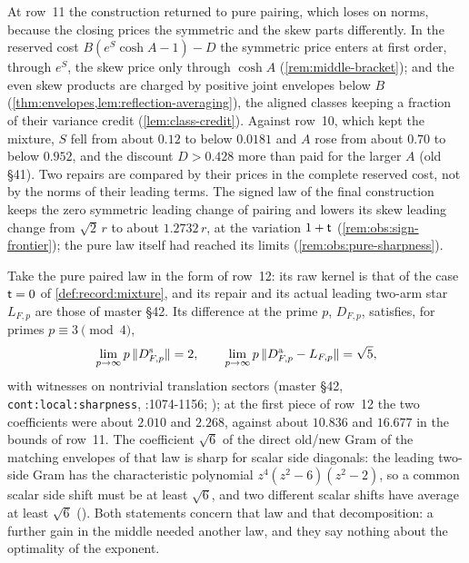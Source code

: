 At row~11 the construction returned to pure pairing, which loses on norms,
because the closing prices the symmetric and the skew parts differently. In the
reserved cost $B(e^S\cosh A-1)-D$ the symmetric price enters at first order,
through $e^S$, the skew price only through $\cosh A$ (\cref{rem:middle-bracket});
and the even skew products are charged by positive joint envelopes below $B$
(\cref{thm:envelopes,lem:reflection-averaging}), the aligned classes keeping a
fraction of their variance credit (\cref{lem:class-credit}). Against row~10,
which kept the mixture, $S$ fell from about $0.12$ to below $0.0181$ and $A$
rose from about $0.70$ to below $0.952$, and the discount $D>0.428$ more than
paid for the larger $A$ (old \S41). Two repairs are compared by their prices in
the complete reserved cost, not by the norms of their leading terms. The signed
law of the final construction keeps the zero symmetric leading change of
pairing and lowers its skew leading change from $\sqrt2\,r$ to about
$1.2732\,r$, at the variation $1+\mathsf t$ (\cref{rem:obs:sign-frontier}); the pure
law itself had reached its limits (\cref{rem:obs:pure-sharpness}).

\begin{remark}\label{rem:obs:pure-sharpness}
Take the pure paired law in the form of row~12: its raw kernel is that of the
case $\mathsf t=0$ of \cref{def:record:mixture}, and its repair and its actual
leading two-arm star $L_{F,p}$ are those of master \S42. Its difference at the prime $p$, $D_{F,p}$, satisfies, for primes $p\equiv3\pmod4$,
\[
 \lim_{p\to\infty}p\,\|D^{\rm s}_{F,p}\|=2,\qquad
 \lim_{p\to\infty}p\,\|D^{\rm a}_{F,p}-L_{F,p}\|=\sqrt5,
\]
with witnesses on nontrivial translation sectors (master \S42,
\texttt{cont:local:sharpness},
:1074-1156;
); at the first piece
of row~12 the two coefficients were about $2.010$ and $2.268$, against about
$10.836$ and $16.677$ in the bounds of row~11. The coefficient $\sqrt6$ of the
direct old/new Gram of the matching envelopes of that law is sharp for scalar
side diagonals: the leading two-side Gram has the characteristic polynomial
$z^4(z^2-6)(z^2-2)$, so a common scalar side shift must be at least $\sqrt6$,
and two different scalar shifts have average at least $\sqrt6$
().
Both statements concern that law and that decomposition: a further gain in the
middle needed another law, and they say nothing about the optimality of the
exponent.
\end{remark}

